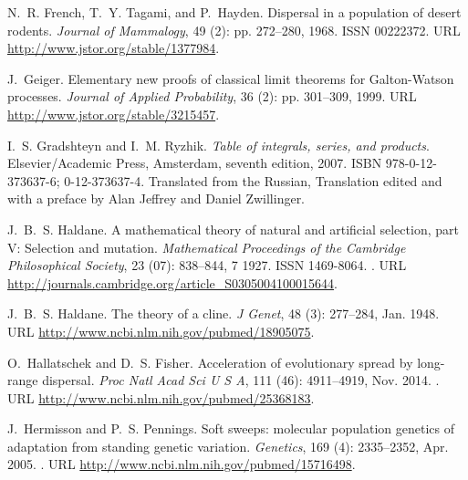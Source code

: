 \documentclass[10pt,letterpaper]{article}
\begin{document}
\begin{thebibliography}{68}
N.~R. French, T.~Y. Tagami, and P.~Hayden.
\newblock Dispersal in a population of desert rodents.
\newblock \emph{Journal of Mammalogy}, 49 (2): pp. 272--280,
  1968.
\newblock ISSN 00222372.
\newblock URL \url{http://www.jstor.org/stable/1377984}.

J.~Geiger.
\newblock Elementary new proofs of classical limit theorems for
  {Galton}-{Watson} processes.
\newblock \emph{Journal of Applied Probability}, 36 (2): pp.
  301--309, 1999.
\newblock URL \url{http://www.jstor.org/stable/3215457}.

I.~S. Gradshteyn and I.~M. Ryzhik.
\newblock \emph{Table of integrals, series, and products}.
\newblock Elsevier/Academic Press, Amsterdam, seventh edition, 2007.
\newblock ISBN 978-0-12-373637-6; 0-12-373637-4.
\newblock Translated from the Russian, Translation edited and with a preface by
  Alan Jeffrey and Daniel Zwillinger.

J.~B.~S. Haldane.
\newblock A mathematical theory of natural and artificial selection, part {V}:
  Selection and mutation.
\newblock \emph{Mathematical Proceedings of the Cambridge Philosophical
  Society}, 23 (07): 838--844, 7 1927.
\newblock ISSN 1469-8064.
\newblock {}.
\newblock URL \url{http://journals.cambridge.org/article_S0305004100015644}.

J.~B.~S. Haldane.
\newblock The theory of a cline.
\newblock \emph{J Genet}, 48 (3): 277--284, Jan. 1948.
\newblock URL \url{http://www.ncbi.nlm.nih.gov/pubmed/18905075}.

O.~Hallatschek and D.~S. Fisher.
\newblock Acceleration of evolutionary spread by long-range dispersal.
\newblock \emph{Proc Natl Acad Sci U S A}, 111 (46):
  4911--4919, Nov. 2014.
\newblock {}.
\newblock URL \url{http://www.ncbi.nlm.nih.gov/pubmed/25368183}.

J.~Hermisson and P.~S. Pennings.
\newblock Soft sweeps: molecular population genetics of adaptation from
  standing genetic variation.
\newblock \emph{Genetics}, 169 (4): 2335--2352, Apr. 2005.
\newblock {}.
\newblock URL \url{http://www.ncbi.nlm.nih.gov/pubmed/15716498}.


\end{thebibliography}
\end{document}
